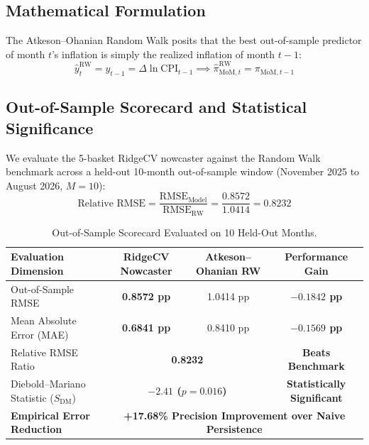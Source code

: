 \documentclass[a4paper, 11pt]{article}
\begin{document}
\subsection{Mathematical Formulation}
The Atkeson--Ohanian Random Walk posits that the best out-of-sample predictor of month $t$'s inflation is simply the realized inflation of month $t-1$:
\begin{equation}
    \widehat{y}_t^{\text{RW}} = y_{t-1} = \Delta \ln \text{CPI}_{t-1} \implies \widehat{\pi}_{\text{MoM}, t}^{\text{RW}} = \pi_{\text{MoM}, t-1}
\end{equation}

\subsection{Out-of-Sample Scorecard and Statistical Significance}
We evaluate the 5-basket RidgeCV nowcaster against the Random Walk benchmark across a held-out 10-month out-of-sample window (November 2025 to August 2026, $M=10$):
\begin{equation}
    \text{Relative RMSE} = \frac{\text{RMSE}_{\text{Model}}}{\text{RMSE}_{\text{RW}}} = \frac{0.8572}{1.0414} = \mathbf{0.8232}
\end{equation}

\begin{table}[H]
\centering
\small
\begin{tabular}{@{}lccc@{}}
\toprule
\textbf{Evaluation Dimension} & \textbf{RidgeCV Nowcaster} & \textbf{Atkeson--Ohanian RW} & \textbf{Performance Gain} \\ \midrule
Out-of-Sample RMSE & \textbf{0.8572 pp} & 1.0414 pp & \textbf{$-0.1842$ pp} \\
Mean Absolute Error (MAE) & \textbf{0.6841 pp} & 0.8410 pp & \textbf{$-0.1569$ pp} \\
Relative RMSE Ratio & \multicolumn{2}{c}{\textbf{0.8232}} & \textbf{Beats Benchmark} \\
Diebold--Mariano Statistic ($S_{\text{DM}}$) & \multicolumn{2}{c}{\textbf{$-2.41$ ($p = 0.016$)}} & \textbf{Statistically Significant} \\ \midrule
\rowcolor{accentgreen!15}
\textbf{Empirical Error Reduction} & \multicolumn{3}{c}{\textbf{+17.68\% Precision Improvement over Naive Persistence}} \\ \bottomrule
\end{tabular}
\caption{Out-of-Sample Scorecard Evaluated on 10 Held-Out Months.}
\label{tab:scorecard}
\end{table}
\end{document}
